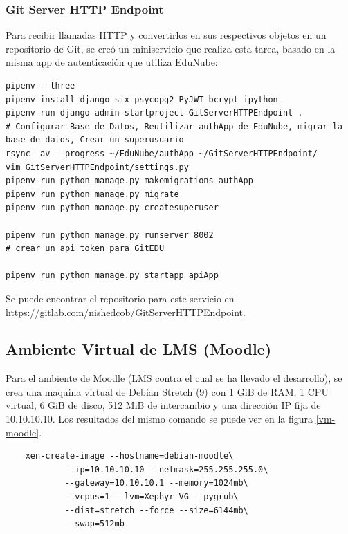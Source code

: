 \subsubsection{Git Server HTTP Endpoint}
Para recibir llamadas HTTP y convertirlos en sus respectivos objetos en un repositorio de Git, se creó un miniservicio que realiza esta tarea, basado en la misma app de autenticación que utiliza EduNube:
\begin{lstlisting}
pipenv --three
pipenv install django six psycopg2 PyJWT bcrypt ipython
pipenv run django-admin startproject GitServerHTTPEndpoint .
# Configurar Base de Datos, Reutilizar authApp de EduNube, migrar la base de datos, Crear un superusuario
rsync -av --progress ~/EduNube/authApp ~/GitServerHTTPEndpoint/
vim GitServerHTTPEndpoint/settings.py
pipenv run python manage.py makemigrations authApp
pipenv run python manage.py migrate
pipenv run python manage.py createsuperuser

pipenv run python manage.py runserver 8002
# crear un api token para GitEDU

pipenv run python manage.py startapp apiApp
\end{lstlisting}

Se puede encontrar el repositorio para este servicio en \url{https://gitlab.com/nishedcob/GitServerHTTPEndpoint}.

 
\subsection{Ambiente Virtual de LMS  (Moodle)}
\label{instalacion-moodle}

Para el ambiente de Moodle (LMS  contra el cual se ha llevado el desarrollo), se crea una maquina virtual de Debian Stretch (9) con 1 GiB de RAM, 1 CPU virtual, 6 GiB de disco, 512 MiB de intercambio y una dirección IP fija de 10.10.10.10. Los resultados del mismo comando se puede ver en la figura \ref{vm-moodle}.
\begin{lstlisting}
	xen-create-image --hostname=debian-moodle\
    		--ip=10.10.10.10 --netmask=255.255.255.0\
        	--gateway=10.10.10.1 --memory=1024mb\
        	--vcpus=1 --lvm=Xephyr-VG --pygrub\
        	--dist=stretch --force --size=6144mb\
        	--swap=512mb
\end{lstlisting}

